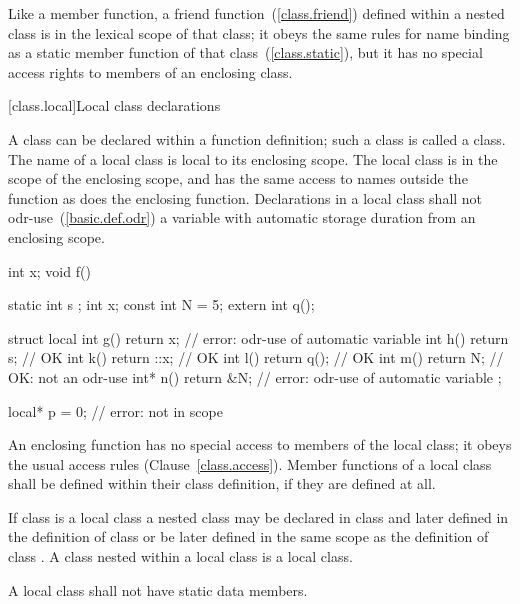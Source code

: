 \pnum
{}%
Like a member function, a friend function~(\ref{class.friend}) defined
within a nested class is in the lexical scope of that class; it obeys
the same rules for name binding as a static member function of that
class~(\ref{class.static}), but it has no special access rights to
members of an enclosing class.

[class.local]{Local class declarations}
%
%

\pnum
A class can be declared within a function definition; such a class is
called a  class. The name of a local class is local to
its enclosing scope.
%
The local class is in the scope of the enclosing scope, and has the same
access to names outside the function as does the enclosing function.
Declarations in a local class
shall not odr-use~(\ref{basic.def.odr}) a variable with automatic storage
duration from an
enclosing scope.
\enterexample
{}%
\begin{codeblock}
int x;
void f() {
  static int s ;
  int x;
  const int N = 5;
  extern int q();

  struct local {
    int g() { return x; }       // error: odr-use of automatic variable 
    int h() { return s; }       // OK
    int k() { return ::x; }     // OK
    int l() { return q(); }     // OK
    int m() { return N; }       // OK: not an odr-use
    int* n() { return &N; }     // error: odr-use of automatic variable 
  };
}

local* p = 0;                   // error:  not in scope
\end{codeblock}
\exitexample

\pnum
An enclosing function has no special access to members of the local
class; it obeys the usual access rules (Clause~\ref{class.access}).
%
Member functions of a local class shall be defined within their class
definition, if they are defined at all.

\pnum
{}%
If class  is a local class a nested class  may be
declared in class  and later defined in the definition of class
 or be later defined in the same scope as the definition of
class .
%
A class nested within
a local class is a local class.

\pnum
A local class shall not have static data members.

